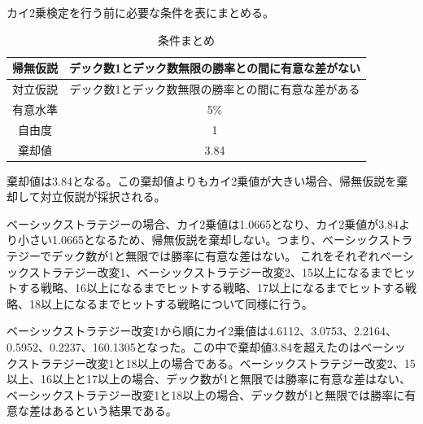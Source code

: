 カイ2乗検定を行う前に必要な条件を表\label{hypothesis2}にまとめる。
\begin{table}[H]
 \caption{条件まとめ\label{hypothesis2}}
 \begin{center}
  \begin{tabular}{|c|c|}
  \hline 帰無仮説 & デック数1とデック数無限の勝率との間に有意な差がない \\
  \hline 対立仮説 & デック数1とデック数無限の勝率との間に有意な差がある \\
  \hline 有意水準 & 5\% \\
  \hline 自由度 & 1 \\
  \hline 棄却値 & 3.84 \\
  \hline 
  \end{tabular}
 \end{center}
\end{table}
棄却値は3.84となる。この棄却値よりもカイ2乗値が大きい場合、帰無仮説を棄却して対立仮説が採択される。

ベーシックストラテジーの場合、カイ2乗値は1.0665となり、カイ2乗値が3.84より小さい1.0665となるため、帰無仮説を棄却しない。つまり、ベーシックストラテジーでデック数が1と無限では勝率に有意な差はない。
これをそれぞれベーシックストラテジー改変1、ベーシックストラテジー改変2、15以上になるまでヒットする戦略、16以上になるまでヒットする戦略、17以上になるまでヒットする戦略、18以上になるまでヒットする戦略について同様に行う。

ベーシックストラテジー改変1から順にカイ2乗値は4.6112、3.0753、2.2164、0.5952、0.2237、160.1305となった。この中で棄却値3.84を超えたのはベーシックストラテジー改変1と18以上の場合である。ベーシックストラテジー改変2、15以上、16以上と17以上の場合、デック数が1と無限では勝率に有意な差はない、ベーシックストラテジー改変1と18以上の場合、デック数が1と無限では勝率に有意な差はあるという結果である。

